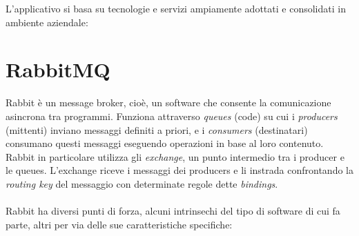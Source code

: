 L'applicativo si basa su tecnologie e servizi ampiamente adottati e consolidati in ambiente aziendale:

\section{RabbitMQ}
%
Rabbit \`e un message broker, cio\`e, un software che consente la comunicazione asincrona tra programmi.
Funziona attraverso \textit{queues} (code) su cui i \textit{producers} (mittenti) inviano messaggi definiti a priori,
e i \textit{consumers} (destinatari) consumano questi messaggi eseguendo operazioni in base al loro contenuto.
Rabbit in particolare utilizza gli \textit{exchange}, un punto intermedio tra i producer e le queues.
L'exchange riceve i messaggi dei producers e li instrada confrontando la \textit{routing key} del messaggio con determinate regole dette \textit{bindings}.\\\\
%
Rabbit ha diversi punti di forza, alcuni intrinsechi del tipo di software di cui fa parte, altri per via delle sue caratteristiche specifiche:\
